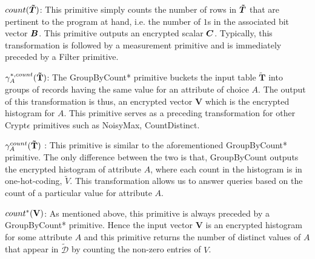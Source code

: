  
 $count(\boldsymbol{\tilde{T}})$: This primitive simply counts the number of rows in $\boldsymbol{\tilde{T}}$ that are pertinent to the program at hand, i.e. the number of $1$s in the associated bit vector $\boldsymbol{B}$.  This primitive outputs an encrypted scalar $\boldsymbol{C}$. Typically, this transformation is followed by a measurement primitive and is immediately preceded by a \textsf{Filter} primitive. 

 $\gamma^{*,count}_{A}(\mathbf{\tilde{T}})$: The  \textsf{GroupByCount*} primitive buckets the input table $\mathbf{\tilde{T}}$ into groups of records having the same value for an attribute of choice $A$. The output of this transformation is thus, an encrypted  vector $\mathbf{V}$ which is the encrypted histogram for $A$.
    This primitive serves as a preceding transformation for other Crypt$\epsilon$ primitives such as \textsf{NoisyMax}, \textsf{CountDistinct}.

 $\gamma^{count}_{A}(\mathbf{\tilde{T}})$ : This primitive is similar to the aforementioned \textsf{GroupByCount*} primitive. The only difference between the two is that, \textsf{GroupByCount} outputs the encrypted histogram of attribute $A$, where each count in the histogram is in one-hot-coding, $\tilde{V}$.  This transformation allows us to answer queries based on the count of a particular value for attribute $A$.

$count^*(\mathbf{V})$: As mentioned above, this primitive is always preceded by a \textsf{GroupByCount*} primitive. Hence the input vector $\mathbf{V}$ is an encrypted histogram for some attribute $A$ and this primitive returns the number of distinct values of $A$ that appear in  $\boldsymbol{\tilde{\mathcal{D}}}$ by counting the non-zero entries of $V$.


